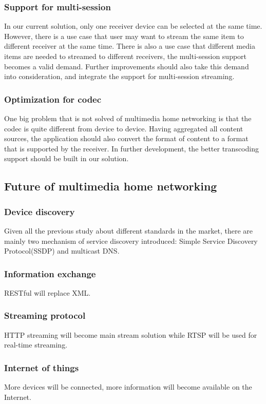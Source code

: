 \subsubsection{Support for multi-session}
In our current solution, only one receiver device can be selected at the same time. However, there is a use case that user may want to stream the same item to different receiver at the same time. There is also a use case that different media items are needed to streamed to different receivers, the multi-session support becomes a valid demand. Further improvements should also take this demand into consideration, and integrate the support for multi-session streaming.
\subsubsection{Optimization for codec}
One big problem that is not solved of multimedia home networking is that the codec is quite different from device to device. Having aggregated all content sources, the application should also convert the format of content to a format that is supported by the receiver. In further development, the better transcoding support should be built in our solution.
\subsection{Future of multimedia home networking}
\subsubsection{Device discovery}
Given all the previous study about different standards in the market, there are mainly two mechanism of service discovery introduced: Simple Service Discovery Protocol(SSDP) and multicast DNS. 
\subsubsection{Information exchange}
RESTful will replace XML.
\subsubsection{Streaming protocol}
HTTP streaming will become main stream solution while RTSP will be used for real-time streaming.
\subsubsection{Internet of things}
More devices will be connected, more information will become available on the Internet.